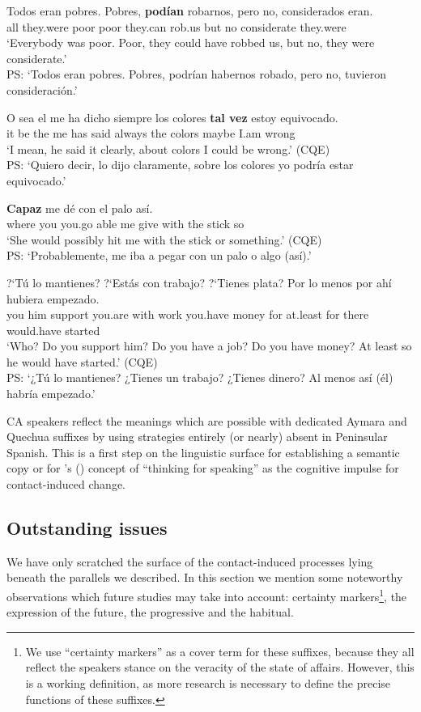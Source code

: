 \documentclass[output=paper,hidelinks]{langscibook}
\begin{document}
 \ea \label{ex:poor}
\gll Todos eran pobres. Pobres, \textbf{podían} robarnos, pero no, considerados eran. \\
all they.were poor poor they.can rob.us but no considerate they.were\\
\glt `Everybody was poor. Poor, they could have robbed us, but no, they were considerate.' \citep[47]{dankelpagel2012}\\
PS: `Todos eran pobres. Pobres, podrían habernos robado, pero no, tuvieron consideración.'
\z 

\ea \label{ex:colors}
\gll O sea el me ha dicho siempre los colores \textbf{tal vez} estoy equivocado. \\
 it be the me has said always the colors maybe I.am wrong \\ 
 \glt ‘I mean, he said it clearly, about colors I could be wrong.’ (CQE)\\
 PS: `Quiero decir, lo dijo claramente, sobre los colores yo podría estar equivocado.'
\z 

\ea \label{ex:capaz}
\gll \textbf{Capaz} me dé con el palo así. \\
where you you.go able me give with the stick so \\ 
 \glt ‘She would possibly hit me with the stick or something.' (CQE)\\
 PS: `Probablemente, me iba a pegar con un palo o algo (así).'
\z 


\ea \label{ex:job}
\gll ?`Tú lo mantienes? ?`Estás con trabajo? ?`Tienes plata? Por {lo menos} por ahí hubiera empezado. \\
 you him support you.are with work you.have money for {at.least} for there would.have started\\ \glt ‘Who? Do you support him? Do you have a job? Do you have money? At least so he would have started.' (CQE)\\
 PS: `¿Tú lo mantienes? ¿Tienes un trabajo? ¿Tienes dinero? Al menos así (él) habría empezado.'
\z

 CA speakers reflect the meanings which are possible with dedicated Aymara and Quechua suffixes by using strategies entirely (or nearly) absent in Peninsular Spanish. This is a first step on the linguistic surface for establishing a semantic copy \citep{RN59} or for \citeauthor{slobin2016thinking}'s (\citeyear{slobin2016thinking}) concept of “thinking for speaking” as the cognitive impulse for contact-induced change. 

\subsection{Outstanding issues}
\label{sec:outstandingissues}
We have only scratched the surface of the contact-induced processes lying beneath the parallels we described. In this section we mention some noteworthy observations which future studies may take into account: certainty markers\footnote{We use ``certainty markers'' as a cover term for these suffixes, because they all reflect the speakers stance on the veracity of the state of affairs. However, this is a working definition, as more research is necessary to define the precise functions of these suffixes.}, the expression of the future, the progressive and the habitual. 
\end{document}
